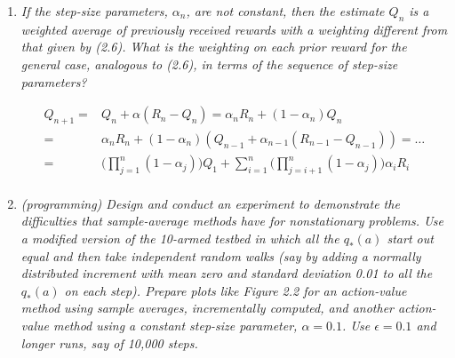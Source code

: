 \documentclass[12pt,a4paper]{article}
\begin{document}
\begin{enumerate}
\item
  \textit{If the step-size parameters, $\alpha_n$, are not constant, then the estimate $Q_n$ is
  a weighted average of previously received rewards with a weighting different from that
  given by (2.6). What is the weighting on each prior reward for the general case, analogous
  to (2.6), in terms of the sequence of step-size parameters?}

  \begin{align*}
  Q_{n + 1} = & Q_n + \alpha(R_n - Q_n) = \alpha_n R_n + (1 - \alpha_n)Q_n \\
  = & \alpha_n R_n + (1 - \alpha_n)(Q_{n - 1} + \alpha_{n - 1}(R_{n - 1} - Q_{n - 1})) = \dots \\
  = & \Big(\prod\limits_{j = 1}^n (1 - \alpha_j)\Big) Q_1 +
  \sum\limits_{i = 1}^n \Big(\prod\limits_{j = i + 1}^n (1 - \alpha_j) \Big)\alpha_i R_i \\
  \end{align*}

\item
  \textit{(programming) Design and conduct an experiment to demonstrate the
  difficulties that sample-average methods have for nonstationary problems. Use a modified
  version of the 10-armed testbed in which all the $q_*(a)$ start out equal and then take
  independent random walks (say by adding a normally distributed increment with mean
  zero and standard deviation 0.01 to all the $q_*(a)$ on each step). Prepare plots like
  Figure 2.2 for an action-value method using sample averages, incrementally computed,
  and another action-value method using a constant step-size parameter, $\alpha = 0.1$. Use
  $\epsilon = 0.1$ and longer runs, say of 10,000 steps.}


\end{enumerate}
\end{document}
